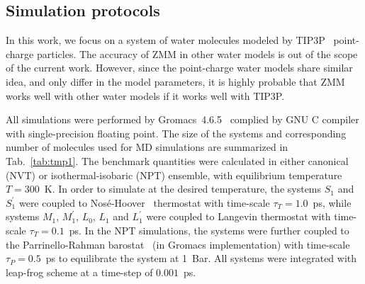 \documentclass[a4paper,preprint,unsortedaddress,onecolumn,fleqn]{revtex4}
\begin{document}
\subsection{Simulation protocols}

\label{sec:protocols} In this work, we focus on a system of water molecules
modeled by TIP3P~\cite{jorgensen1983comparison} point-charge particles. 
The accuracy of ZMM in other water models is out of the scope of the
current work. However, since the point-charge water models share similar
idea, and only differ in the model parameters, it is highly probable that ZMM
works well with other water models if it works well with TIP3P.

All simulations were performed by Gromacs~4.6.5~\cite{hess2008gromacs,
pronk2013gromacs} complied by GNU C compiler with single-precision floating
point. The size of the systems and corresponding number of molecules used
for MD simulations are summarized in Tab.~\ref{tab:tmp1}. The benchmark
quantities were calculated in either canonical (NVT) or isothermal-isobaric
(NPT) ensemble, with equilibrium temperature $T=300$~K. In order to simulate
at the desired temperature, the systems $S_{1}$ and $S_{1}^{\prime }$ were
coupled to Nos\'{e}-Hoover~\cite{nose1984molecular,hoover1985canonical}
thermostat with time-scale $\tau _{T}=1.0$~ps, while systems $M_{1}$, $%
M_{1}^{\prime }$, $L_{0}$, $L_{1}$ and $L_{1}^{\prime }$ were coupled to
Langevin thermostat with time-scale $\tau _{T}=0.1$~ps. In the NPT
simulations, the systems were further coupled to the Parrinello-Rahman
barostat~\cite{parrinello1980crystal,parrinello1981polymorphic} (in Gromacs
implementation) with time-scale $\tau _{P}=0.5$~ps to equilibrate the system
at 1~Bar. All systems were integrated with leap-frog scheme at a time-step
of $0.001$~ps.

\end{document}
